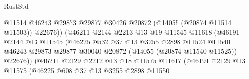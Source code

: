 \begin{lexlean}{RustStd}
\begin{coremodule}
                                          @11514
                                          @46243
                                          @29873
                                          @29877
                                          @30426
                                          @20872
                                          (@14055 (@20874 @11514 @11503))
                                          @22676))
                                      (@46211
                                        @2144
                                        @2213
                                        @13
                                        @19
                                        @11545
                                        @11618
                                        (@46191
                                          @2144
                                          @13
                                          @11545
                                          (@46225
                                            @532
                                            @37
                                            @13
                                            @3255
                                            @2898
                                            @11524
                                            @11540
                                            @46243
                                            @29873
                                            @29877
                                            @30040
                                            @20872
                                            (@14055 (@20874 @11540 @11525))
                                            @22676))
                                        (@46211
                                          @2129
                                          @2212
                                          @13
                                          @18
                                          @11575
                                          @11617
                                          (@46191
                                            @2129
                                            @13
                                            @11575
                                            (@46225
                                              @608
                                              @37
                                              @13
                                              @3255
                                              @2898
                                              @11550

\end{coremodule}
\end{lexlean}
